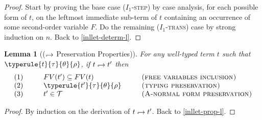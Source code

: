\documentclass[a4paper,11pt,oneside]{article}
\theoremstyle{plain}
\newtheorem{lemma}[definition]{Lemma}
\newcommand{\inlT}{\mathcal{T}}
\newcommand{\hookdownarrow}{\mathrel{\rotatebox[origin=c]{180}{$\hookleftarrow$}}}
\newcommand{\inlletarr}{\hookdownarrow}
\newcommand{\inllet}[2]{#1 \hookdownarrow #2}
\begin{document}
\begin{proof}
Start by proving the base case (\textsc{$I_1$-step}) by case analysis, for each possible form of $t$, on the leftmost immediate sub-term of $t$ containing an occurrence of some second-order variable $F$. 
	  Do the remaining  (\textsc{$I_1$-trans}) case	by strong induction on $n$.  Back to \ref{inllet-determ-l}.
\end{proof}	
	
\begin{lemma}[($\inlletarr$ Preservation Properties)]
For any well-typed term $t$ such that\\ $\typerule{t}{\tau}{\theta}{\rho}$, if $\inllet{t}{t'}$ then
\begin{displaymath}
\begin{array}{l@{\hspace*{1cm}}l@{\hspace*{1cm}}l}
	(1)& FV(t') \subseteq FV(t) & \textsc{(free variables inclusion)} \\
	(2)& \typerule{t'}{\tau}{\theta}{\rho} &\textsc{(typing preservation)} \\
	(3)& t' \in \inlT & \textsc{(A-normal form preservation)}
\end{array}
\end{displaymath}
 \label{inllet-prop-p}
\end{lemma}

\begin{proof}
 By induction on the derivation of $\inllet{t}{t'}$.
 \label{TODO-inllet-prop-p}
 Back to \ref{inllet-prop-l}.
 \end{proof}	
	
\end{document}
